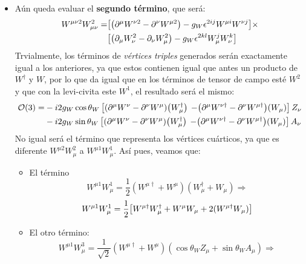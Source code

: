 \begin{itemize}
	\item Aún queda evaluar el \textbf{segundo término}, que será: 
	\begin{align}  
		W^{\mu \nu 2} W_{\mu \nu}^2 = & \bqty{\pqty{\partial^\mu W^{\nu 2} - \partial^\nu W^{\mu 2}} - g_W \epsilon^{2ij} W^{\mu i} W^{\nu j}} \times \nonumber \\
		& \bqty{\pqty{\partial_\mu W^2_\nu - \partial_\nu W^2_\mu} - g_W 	\epsilon^{2kl} W^j_\mu W^k_\nu} \label{Ec:ej10-02}
	\end{align}
	Trvialmente, los términos de \textit{vértices triples} generados serán exactamente igual a los anteriores, ya que estos contienen igual que antes un producto de $W^\dagger$ y $W$, por lo que da igual que en los términos de tensor de  campo esté $W^2$ y que con la levi-civita este $W^1$, el resultado será el mismo: 
	\begin{align}
		\Ocal(3)  = &  - {i2 g_W \cos \theta_W}\left[ \pqty{\partial^\mu W^{\nu } - \partial^\nu W^{\mu }}\pqty{ W^\dagger_\mu } \nonumber  \right. 
		\left. - \pqty{\partial^\mu W^{\nu \dagger } - \partial^\nu W^{\mu \dagger}}\pqty{ W_\mu } \right] Z_\nu \nonumber \\ & - 
		 {i2 g_W\sin \theta_W}\left[ \pqty{\partial^\mu W^{\nu } - \partial^\nu W^{\mu }}\pqty{ W^\dagger_\mu } \nonumber  \right. 
		 \left. - \pqty{\partial^\mu W^{\nu \dagger } - \partial^\nu W^{\mu \dagger}}\pqty{ W_\mu} \right] A_\nu 
	\end{align}
	No igual será el término que representa los vértices cuárticos, ya que es diferente $W^{\mu 2}W_{\mu}^2$ a $W^{\mu 1}W_{\mu}^1$. Así pues, veamos que: 
	\begin{itemize}
		\item El término
		\begin{equation}
			W^{\mu  1} W_{\mu}^1 =  \frac{1}{2} (W^{\mu \dagger} + W^{\mu})(W_{\mu}^{\dagger} + W_{\mu}) \Longrightarrow
  		\end{equation}
		\begin{equation}
			W^{\mu  1} W_{\mu}^1 =  \frac{1}{2} \bqty{W^{\mu \dagger} W_{\mu}^{\dagger} + W^{\mu } W_{\mu} +  2(W^{\mu \dagger} W_{\mu})  }
		\end{equation}
		\item El otro término: 
		\begin{equation}
			W^{\mu  1} W_{\mu}^3 =  \frac{1}{\sqrt{2}} (W^{\mu \dagger} + W^{\mu})( \cos \theta_W Z_{\mu} + \sin \theta_W A_\mu) \Longrightarrow
  		\end{equation}
		\begin{equation}

\end{equation}
\end{itemize}
\end{itemize}
